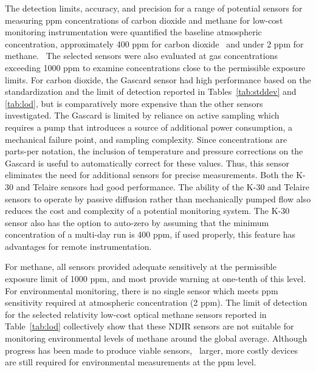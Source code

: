 \documentclass[times]{joehreview}
\begin{document}
	The detection limits, accuracy, and precision for a range of potential sensors for measuring ppm concentrations of carbon dioxide and methane for low-cost monitoring instrumentation were quantified the baseline atmospheric concentration, approximately 400 ppm for carbon dioxide~\cite{blasing_recent_2016,dlugokencky_trends_2016} and under 2 ppm for methane.~\cite{turner_large_2016,bamberger_spatial_2014,dlugokencky_trends_2016-1}  The selected sensors were also evaluated at gas concentrations exceeding 1000 ppm to examine concentrations close to the permissible exposure limits.  For carbon dioxide, the Gascard sensor had high performance based on the standardization and the limit of detection reported in Tables~\ref{tab:stddev} and \ref{tab:lod}, but is comparatively more expensive than the other sensors investigated.  The Gascard is limited by reliance on active sampling which requires a pump that introduces a source of additional power consumption, a mechanical failure point, and sampling complexity.  Since concentrations are parts-per notation, the inclusion of temperature and pressure corrections on the Gascard is useful to automatically correct for these values.  Thus, this sensor eliminates the need for additional sensors for precise measurements.   Both the K-30 and Telaire sensors had good performance.  The ability of the K-30 and Telaire sensors to operate by passive diffusion rather than mechanically pumped flow also reduces the cost and complexity of a potential monitoring system.   The K-30 sensor also has the option to auto-zero by assuming that the minimum concentration of a multi-day run is 400 ppm, if used properly, this feature has advantages for remote instrumentation.
	
	For methane, all sensors provided adequate sensitively at the permissible exposure limit of 1000 ppm, and most provide warning at one-tenth of this level.  For environmental monitoring, there is no single sensor which meets ppm sensitivity required at atmospheric concentration (2 ppm).  The limit of detection for the selected relativity low-cost optical methane sensors reported in Table~\ref{tab:lod} collectively show that these NDIR sensors are not suitable for monitoring environmental levels of methane around the global average.  Although progress has been made to produce viable sensors,~\cite{zhu_one_2012} larger, more costly devices are still required for environmental measurements at the ppm level.
	
	
	
	
	
\end{document}
